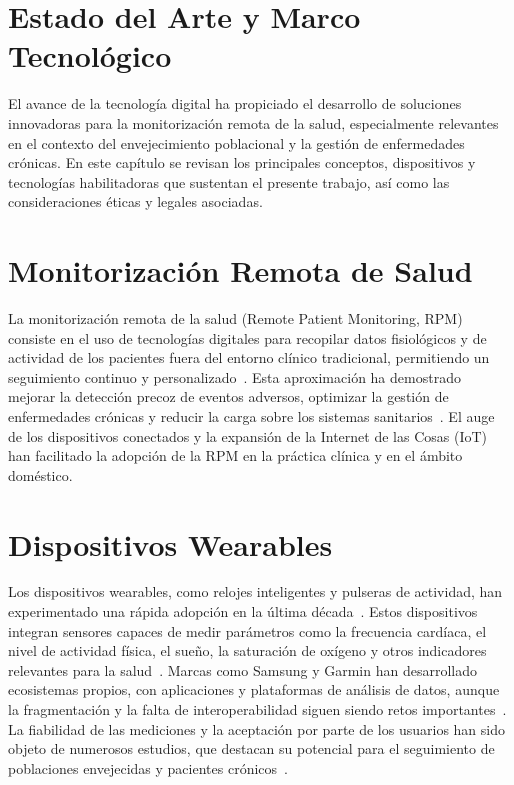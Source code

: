 \section{Estado del Arte y Marco Tecnológico}

El avance de la tecnología digital ha propiciado el desarrollo de soluciones innovadoras para la monitorización remota de la salud, especialmente relevantes en el contexto del envejecimiento poblacional y la gestión de enfermedades crónicas. En este capítulo se revisan los principales conceptos, dispositivos y tecnologías habilitadoras que sustentan el presente trabajo, así como las consideraciones éticas y legales asociadas.

\section{Monitorización Remota de Salud}

La monitorización remota de la salud (Remote Patient Monitoring, RPM) consiste en el uso de tecnologías digitales para recopilar datos fisiológicos y de actividad de los pacientes fuera del entorno clínico tradicional, permitiendo un seguimiento continuo y personalizado~\cite{Majumder2017, Steinhubl2015}. Esta aproximación ha demostrado mejorar la detección precoz de eventos adversos, optimizar la gestión de enfermedades crónicas y reducir la carga sobre los sistemas sanitarios~\cite{Kitsiou2015}. El auge de los dispositivos conectados y la expansión de la Internet de las Cosas (IoT) han facilitado la adopción de la RPM en la práctica clínica y en el ámbito doméstico.

\section{Dispositivos Wearables}

Los dispositivos wearables, como relojes inteligentes y pulseras de actividad, han experimentado una rápida adopción en la última década~\cite{Piwek2016}. Estos dispositivos integran sensores capaces de medir parámetros como la frecuencia cardíaca, el nivel de actividad física, el sueño, la saturación de oxígeno y otros indicadores relevantes para la salud~\cite{Patel2012}. Marcas como Samsung y Garmin han desarrollado ecosistemas propios, con aplicaciones y plataformas de análisis de datos, aunque la fragmentación y la falta de interoperabilidad siguen siendo retos importantes~\cite{Serpush2022, Wright2021}. La fiabilidad de las mediciones y la aceptación por parte de los usuarios han sido objeto de numerosos estudios, que destacan su potencial para el seguimiento de poblaciones envejecidas y pacientes crónicos~\cite{Wright2021, Evenson2015}.

